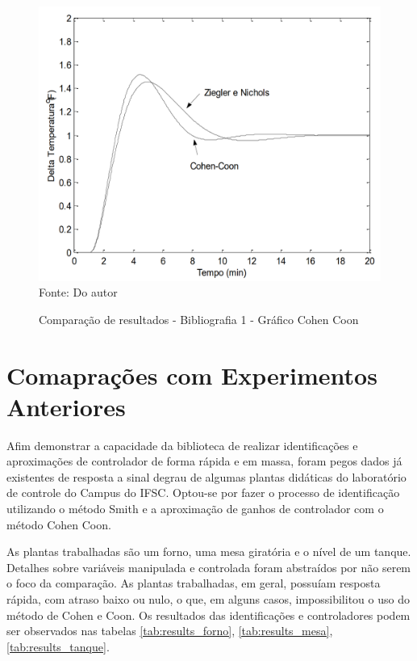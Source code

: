 \begin{figure}[H]
    \centering
    \caption{Comparação de resultados - Bibliografia 1 - Gráfico Cohen Coon}
    \includegraphics[scale=0.4]{figuras/bib_comp_1_ctrl_fig}
    \label{fig:bib_comp_1_ctrl_fig}
    \\
    \vspace{0cm}\hspace{0cm}\small{Fonte: Do autor}
\end{figure}


\section{Comaprações com Experimentos Anteriores}

Afim demonstrar a capacidade da biblioteca de realizar identificações e aproximações de
controlador de forma rápida e em massa, foram pegos dados já existentes de resposta a sinal degrau de algumas plantas
didáticas do laboratório de controle do Campus do IFSC\@.
Optou-se por fazer o processo de identificação utilizando o método Smith e a aproximação de ganhos de controlador
com o método Cohen Coon.

As plantas trabalhadas são um forno, uma mesa giratória e o nível de um tanque.
Detalhes sobre variáveis manipulada e controlada foram abstraídos por não serem o foco da comparação.
As plantas trabalhadas, em geral, possuíam resposta rápida, com atraso baixo ou nulo, o que, em alguns casos,
impossibilitou o uso do método de Cohen e Coon.
Os resultados das identificações e controladores podem ser observados
nas tabelas \ref{tab:results_forno}, \ref{tab:results_mesa}, \ref{tab:results_tanque}.

